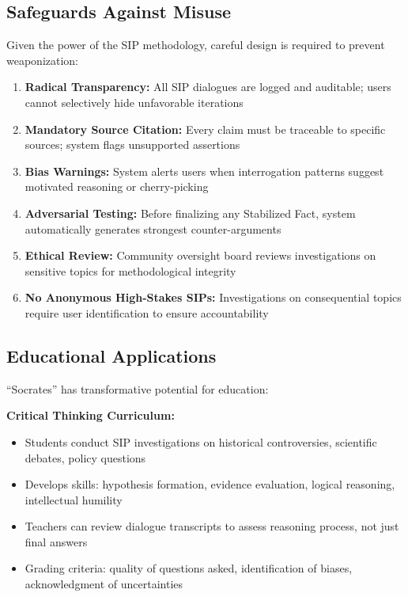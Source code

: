 \documentclass[11pt,a4paper]{article}
\begin{document}
\begin{small}
\subsection{Safeguards Against Misuse}

Given the power of the SIP methodology, careful design is required to prevent weaponization:

\begin{enumerate}[leftmargin=*]
    \item \textbf{Radical Transparency:} All SIP dialogues are logged and auditable; users cannot selectively hide unfavorable iterations
    \item \textbf{Mandatory Source Citation:} Every claim must be traceable to specific sources; system flags unsupported assertions
    \item \textbf{Bias Warnings:} System alerts users when interrogation patterns suggest motivated reasoning or cherry-picking
    \item \textbf{Adversarial Testing:} Before finalizing any Stabilized Fact, system automatically generates strongest counter-arguments
    \item \textbf{Ethical Review:} Community oversight board reviews investigations on sensitive topics for methodological integrity
    \item \textbf{No Anonymous High-Stakes SIPs:} Investigations on consequential topics require user identification to ensure accountability
\end{enumerate}

\subsection{Educational Applications}

``Socrates'' has transformative potential for education:

\textbf{Critical Thinking Curriculum:}
\begin{itemize}[nosep]
    \item Students conduct SIP investigations on historical controversies, scientific debates, policy questions
    \item Develops skills: hypothesis formation, evidence evaluation, logical reasoning, intellectual humility
    \item Teachers can review dialogue transcripts to assess reasoning process, not just final answers
    \item Grading criteria: quality of questions asked, identification of biases, acknowledgment of uncertainties
\end{itemize}


\end{small}
\end{document}
